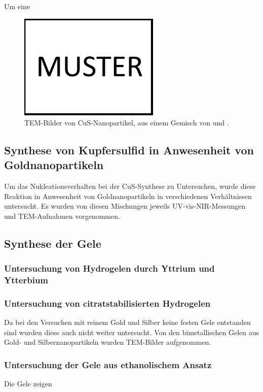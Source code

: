 	Um eine 
	
	\begin{figure}[H]
		\centering
		\includegraphics[width=0.6\textwidth]{Bilder/Muster} 	
		\caption{TEM-Bilder von CuS-Nanopartikel, aus einem Gemisch von  und .}
		\label{fig:TEM-CuCl}
	\end{figure}
	
\subsection{Synthese von Kupfersulfid in Anwesenheit von Goldnanopartikeln}

	Um das Nukleationsverhalten bei der CuS-Synthese zu Untersuchen, wurde diese Reaktion in Anwesenheit von Goldnanopartikeln in verschiedenen Verhältnissen untersucht.
	Es wurden von diesen Mischungen jeweils UV-vis-NIR-Messungen und TEM-Aufnahmen vorgenommen.	
	

\subsection{Synthese der Gele}
	
	\subsubsection{Untersuchung von Hydrogelen durch Yttrium und Ytterbium}
	
	
	
	\subsubsection{Untersuchung von citratstabilisierten Hydrogelen}
	
		Da bei den Versuchen mit reinem Gold und Silber keine festen Gele entstanden sind wurden diese auch nicht weiter untersucht.
		Von den bimetallischen Gelen aus Gold- und Silbernanopartikeln wurden TEM-Bilder aufgenommen.
		
	\subsubsection{Untersuchung der Gele aus ethanolischem Ansatz}
		
		Die Gele zeigen 
 